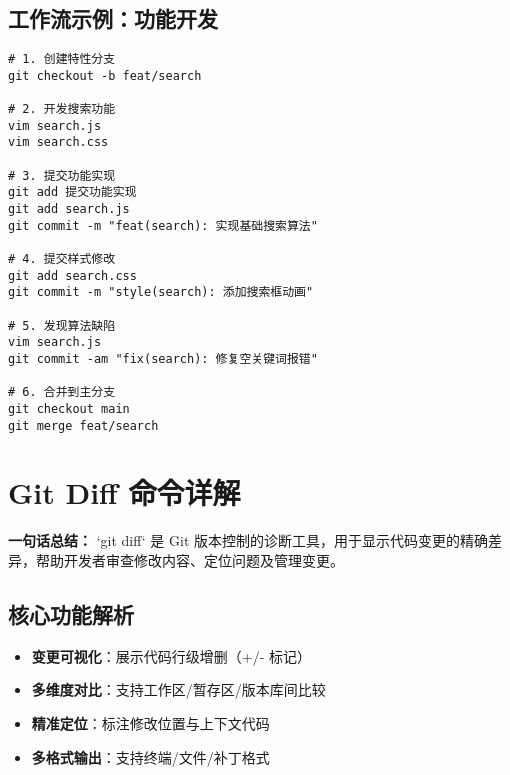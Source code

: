 \subsection{工作流示例：功能开发}
\begin{verbatim}
# 1. 创建特性分支
git checkout -b feat/search

# 2. 开发搜索功能
vim search.js
vim search.css

# 3. 提交功能实现
git add 提交功能实现
git add search.js
git commit -m "feat(search): 实现基础搜索算法"

# 4. 提交样式修改
git add search.css
git commit -m "style(search): 添加搜索框动画"

# 5. 发现算法缺陷
vim search.js
git commit -am "fix(search): 修复空关键词报错"

# 6. 合并到主分支
git checkout main
git merge feat/search
\end{verbatim}


\section{Git Diff 命令详解}
\textbf{一句话总结：}  
`git diff` 是 Git 版本控制的诊断工具，用于显示代码变更的精确差异，帮助开发者审查修改内容、定位问题及管理变更。

\subsection{核心功能解析}
\begin{itemize}[leftmargin=*, nosep]
    \item \textbf{变更可视化}：展示代码行级增删（+/- 标记）
    \item \textbf{多维度对比}：支持工作区/暂存区/版本库间比较
    \item \textbf{精准定位}：标注修改位置与上下文代码
    \item \textbf{多格式输出}：支持终端/文件/补丁格式
\end{itemize}


